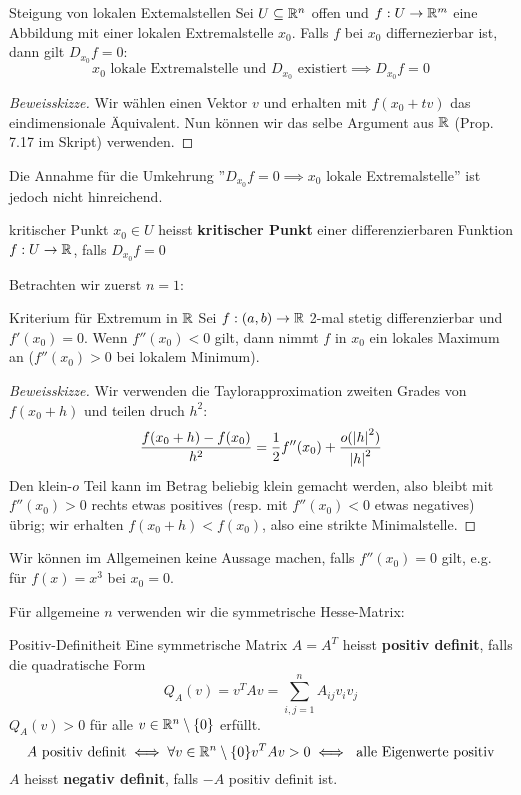 \begin{satz}{Steigung von lokalen Extemalstellen}{}
Sei $U \subseteq \mathbb{R}^n$ offen und $f: U \to \mathbb{R}^m$ eine Abbildung mit einer lokalen Extremalstelle $x_0$. Falls $f$ bei $x_0$ differnezierbar ist, dann gilt $D_{x_0}f=0$:
$$x_0 \text{ lokale Extremalstelle und }D_{x_0} \text{ existiert} \implies D_{x_0}f=0$$
\end{satz}
\begin{proof}[Beweisskizze]
Wir wählen einen Vektor $v$ und erhalten mit $f(x_0 + tv)$ das eindimensionale Äquivalent. Nun können wir das selbe Argument aus $\mathbb{R}$ (Prop. 7.17 im Skript) verwenden.
\end{proof}
Die Annahme für die Umkehrung ''$D_{x_0}f=0 \implies x_0$ lokale Extremalstelle'' ist jedoch nicht hinreichend.
\begin{definition}{kritischer Punkt}{}
$x_0 \in U$ heisst \textbf{kritischer Punkt} einer differenzierbaren Funktion $f: U \to \mathbb{R}$, falls $D_{x_0}f=0$ 
\end{definition}
Betrachten wir zuerst $n = 1$:
\begin{satz}{Kriterium für Extremum in $\mathbb{R}$}{}
Sei $f:(a,b) \to \mathbb{R}$ 2-mal stetig differenzierbar und $f'(x_0)= 0$. Wenn $f''(x_0) < 0$ gilt, dann nimmt $f$ in $x_0$ ein lokales Maximum an ($f''(x_0) > 0$ bei lokalem Minimum).
\end{satz}
\begin{proof}[Beweisskizze] Wir verwenden die Taylorapproximation zweiten Grades von $f(x_0 + h)$ und teilen druch $h^2$:
$$\frac{f(x_0+h)-f(x_0)}{h^2} = \frac{1}{2}f''(x_0) + \frac{o(\left|h\right|^2)}{\left|h\right|^2}$$
Den klein-$o$ Teil kann im Betrag beliebig klein gemacht werden, also bleibt mit $f''(x_0) > 0$ rechts etwas positives (resp. mit $f''(x_0) < 0$ etwas negatives) übrig; wir erhalten $f(x_0+h) < f(x_0)$, also eine strikte Minimalstelle.
\end{proof}
\begin{remark}
Wir können im Allgemeinen keine Aussage machen, falls $f''(x_0) = 0$ gilt, e.g. für $f(x) = x^3$ bei $x_0 = 0$.
\end{remark}
Für allgemeine $n$ verwenden wir die symmetrische Hesse-Matrix:
\begin{definition}{Positiv-Definitheit}{}
Eine symmetrische Matrix $A = A^T$ heisst \textbf{positiv definit}, falls die quadratische Form
$$Q_A(v) = v^TAv = \sum_{i,j = 1}^n A_{ij}v_iv_j$$
$Q_A(v)>0$ für alle $v\in \mathbb{R}^n\setminus\{0\}$ erfüllt.
$$ A \text{ positiv definit} \iff \forall v\in \mathbb{R}^n\setminus\{0\} v^TAv > 0 \iff \text{ alle Eigenwerte positiv}$$
$A$ heisst \textbf{negativ definit}, falls $-A$ positiv definit ist.
\end{definition}

